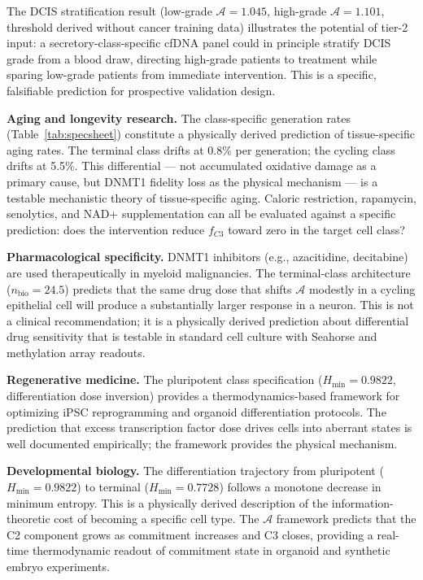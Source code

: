 \documentclass[12pt,a4paper]{article}
\newcommand{\Hmin}{H_{\min}}
\newcommand{\nbio}{n_{\mathrm{bio}}}
\newcommand{\Ascore}{\mathcal{A}}
\begin{document}
The DCIS stratification result (low-grade $\Ascore = 1.045$, high-grade
$\Ascore = 1.101$, threshold derived without cancer training data) illustrates
the potential of tier-2 input: a secretory-class-specific cfDNA panel could
in principle stratify DCIS grade from a blood draw, directing high-grade
patients to treatment while sparing low-grade patients from immediate
intervention. This is a specific, falsifiable prediction for prospective
validation design.

\textbf{Aging and longevity research.} The class-specific generation rates
(Table~\ref{tab:specsheet}) constitute a physically derived prediction of
tissue-specific aging rates. The terminal class drifts at 0.8\% per generation;
the cycling class drifts at 5.5\%. This differential --- not accumulated oxidative
damage as a primary cause, but DNMT1 fidelity loss as the physical mechanism
--- is a testable mechanistic theory of tissue-specific aging. Caloric
restriction, rapamycin, senolytics, and NAD+ supplementation can all be
evaluated against a specific prediction: does the intervention reduce
$f_{C3}$ toward zero in the target cell class?

\textbf{Pharmacological specificity.} DNMT1 inhibitors (e.g., azacitidine,
decitabine) are used therapeutically in myeloid malignancies. The terminal-class
architecture ($\nbio = 24.5$) predicts that the same drug dose that shifts
$\Ascore$ modestly in a cycling epithelial cell will produce a substantially
larger response in a neuron. This is not a clinical recommendation; it is
a physically derived prediction about differential drug sensitivity that
is testable in standard cell culture with Seahorse and methylation array readouts.

\textbf{Regenerative medicine.} The pluripotent class specification
($\Hmin = 0.9822$, differentiation dose inversion) provides a
thermodynamics-based framework for optimizing iPSC reprogramming and
organoid differentiation protocols. The prediction that excess transcription
factor dose drives cells into aberrant states is well documented empirically;
the framework provides the physical mechanism.

\textbf{Developmental biology.} The differentiation trajectory from
pluripotent ($\Hmin = 0.9822$) to terminal ($\Hmin = 0.7728$) follows a
monotone decrease in minimum entropy. This is a physically derived description
of the information-theoretic cost of becoming a specific cell type. The
$\Ascore$ framework predicts that the C2 component grows as commitment increases
and C3 closes, providing a real-time thermodynamic readout of commitment
state in organoid and synthetic embryo experiments.
\end{document}
